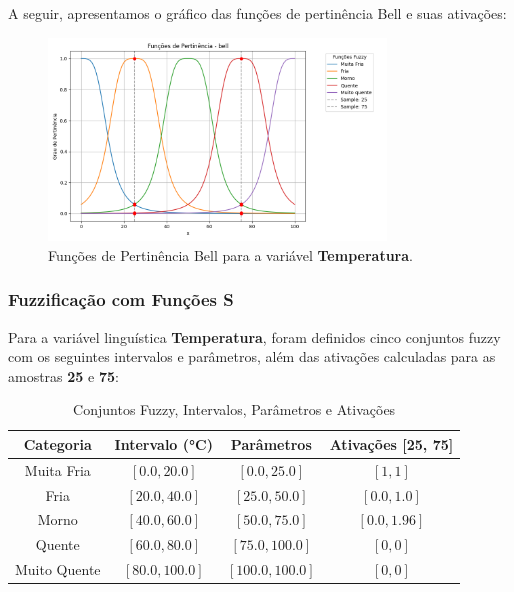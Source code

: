 \documentclass[a4paper,12pt]{article}
\begin{document}
A seguir, apresentamos o gráfico das funções de pertinência Bell e suas ativações:

\begin{figure}[H]
    \centering
    \includegraphics[width=0.8\textwidth]{img/funções_de_pertinência_bell_fuzzificado.png}
    \caption{Funções de Pertinência Bell para a variável \textbf{Temperatura}.}
\end{figure}

\subsubsection{Fuzzificação com Funções S}

Para a variável linguística \textbf{Temperatura}, foram definidos cinco conjuntos fuzzy com os seguintes intervalos e parâmetros, além das ativações calculadas para as amostras \textbf{25} e \textbf{75}:

\begin{table}[H]
\centering
\caption{Conjuntos Fuzzy, Intervalos, Parâmetros e Ativações}
\begin{tabular}{|c|c|c|c|}
\hline
\textbf{Categoria}    & \textbf{Intervalo (°C)} & \textbf{Parâmetros}       & \textbf{Ativações [25, 75]} \\ \hline
Muita Fria            & $[0.0, 20.0]$          & $[0.0, 25.0]$             & $[1, 1]$                   \\ \hline
Fria                  & $[20.0, 40.0]$         & $[25.0, 50.0]$            & $[0.0, 1.0]$               \\ \hline
Morno                 & $[40.0, 60.0]$         & $[50.0, 75.0]$            & $[0.0, 1.96]$              \\ \hline
Quente                & $[60.0, 80.0]$         & $[75.0, 100.0]$           & $[0, 0]$                   \\ \hline
Muito Quente          & $[80.0, 100.0]$        & $[100.0, 100.0]$          & $[0, 0]$                   \\ \hline
\end{tabular}
\end{table}
\end{document}
